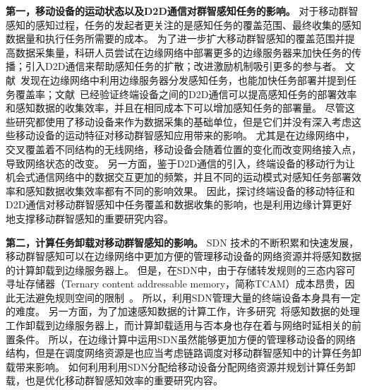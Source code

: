 
\textbf{第一，移动设备的运动状态以及D2D通信对群智感知任务的影响。}
对于移动群智感知的感知过程，任务的发起者更关注的是感知任务的覆盖范围、最终收集的感知数据量和执行任务所需要的成本。
为了进一步扩大移动群智感知的覆盖范围并提高数据采集量，科研人员尝试在边缘网络中部署更多的边缘服务器来加快任务的传播；引入D2D通信来帮助感知任务的扩散；改进激励机制吸引更多的参与者。
文献~发现在边缘网络中利用边缘服务器分发感知任务，也能加快任务部署并提到任务覆盖率；文献~已经验证终端设备之间的D2D通信可以提高感知任务的部署效率和感知数据的收集效率，并且在相同成本下可以增加感知任务的部署量。
尽管这些研究都使用了移动设备来作为数据采集的基础单位，但是它们并没有深入考虑这些移动设备的运动特征对移动群智感知应用带来的影响。
尤其是在边缘网络中，交叉覆盖着不同结构的无线网络，移动设备会随着位置的变化而改变网络接入点，导致网络状态的改变。
另一方面，鉴于D2D通信的引入，终端设备的移动行为让机会式通信网络中的数据交互更加的频繁，并且不同的运动模式对感知任务部署效率和感知数据收集效率都有不同的影响效果。
因此，探讨终端设备的移动特征和D2D通信对移动群智感知中任务覆盖和数据收集的影响，也是利用边缘计算更好地支撑移动群智感知的重要研究内容。



\textbf{第二，计算任务卸载对移动群智感知的影响。}
SDN 技术的不断积累和快速发展，移动群智感知可以在边缘网络中更加方便的管理移动设备的网络资源并将感知数据的计算卸载到边缘服务器上。
但是，在SDN中，由于存储转发规则的三态内容可寻址存储器（Ternary content addressable memory，简称TCAM）成本昂贵，因此无法避免规则空间的限制~\cite{Katta:2014es}。
所以，利用SDN管理大量的终端设备本身具有一定的难度。
另一方面，为了加速感知数据的计算工作，许多研究~\cite{DBLP:conf/mobilecloud/TakahashiTK15,DBLP:conf/edge/LiuWB16}将感知数据的处理工作卸载到边缘服务器上，而计算卸载适用与否本身也存在着与网络时延相关的前置条件。
所以，在边缘计算中运用SDN虽然能够更加方便的管理移动设备的网络结构，但是在调度网络资源是也应当考虑链路调度对移动群智感知中的计算任务卸载带来影响。
如何利用利用SDN分配给移动设备分配网络资源并规划计算任务卸载，也是优化移动群智感知效率的重要研究内容。


